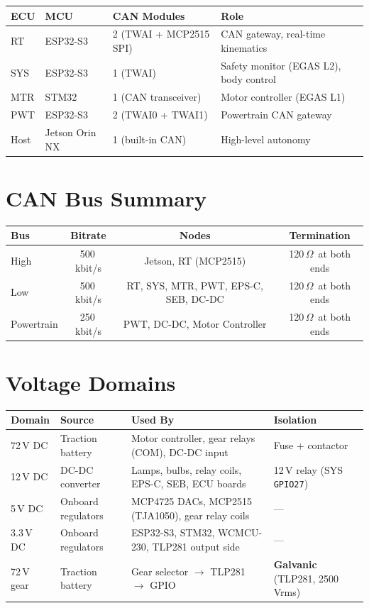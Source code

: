\documentclass[12pt,a4paper,oneside]{report}
\newcommand{\gpio}[1]{\texttt{GPIO#1}}
\begin{document}
\begin{center}
\begin{tabular}{llll}
\toprule
\textbf{ECU} & \textbf{MCU} & \textbf{CAN Modules} & \textbf{Role} \\
\midrule
RT   & ESP32-S3 & 2 (TWAI + MCP2515 SPI)   & CAN gateway, real-time kinematics \\
SYS  & ESP32-S3 & 1 (TWAI)                  & Safety monitor (EGAS L2), body control \\
MTR  & STM32    & 1 (CAN transceiver)       & Motor controller (EGAS L1) \\
PWT  & ESP32-S3 & 2 (TWAI0 + TWAI1)         & Powertrain CAN gateway \\
Host & Jetson Orin NX & 1 (built-in CAN)  & High-level autonomy \\
\bottomrule
\end{tabular}
\end{center}

\section{CAN Bus Summary}

\begin{center}
\begin{tabular}{lccc}
\toprule
\textbf{Bus} & \textbf{Bitrate} & \textbf{Nodes} & \textbf{Termination} \\
\midrule
High       & 500\,kbit/s & Jetson, RT (MCP2515)          & 120\,$\Omega$\ at both ends \\
Low        & 500\,kbit/s & RT, SYS, MTR, PWT, EPS-C, SEB, DC-DC & 120\,$\Omega$\ at both ends \\
Powertrain & 250\,kbit/s & PWT, DC-DC, Motor Controller   & 120\,$\Omega$\ at both ends \\
\bottomrule
\end{tabular}
\end{center}

\section{Voltage Domains}

\begin{center}
\begin{tabular}{llll}
\toprule
\textbf{Domain} & \textbf{Source} & \textbf{Used By} & \textbf{Isolation} \\
\midrule
72\,V DC   & Traction battery & Motor controller, gear relays (COM), DC-DC input & Fuse + contactor \\
12\,V DC   & DC-DC converter  & Lamps, bulbs, relay coils, EPS-C, SEB, ECU boards & 12\,V relay (SYS \gpio{27}) \\
5\,V DC    & Onboard regulators & MCP4725 DACs, MCP2515 (TJA1050), gear relay coils & --- \\
3.3\,V DC  & Onboard regulators & ESP32-S3, STM32, WCMCU-230, TLP281 output side & --- \\
72\,V gear & Traction battery  & Gear selector $\rightarrow$ TLP281 $\rightarrow$ GPIO   & \textbf{Galvanic} (TLP281, 2500\,Vrms) \\
\bottomrule
\end{tabular}
\end{center}
\end{document}
